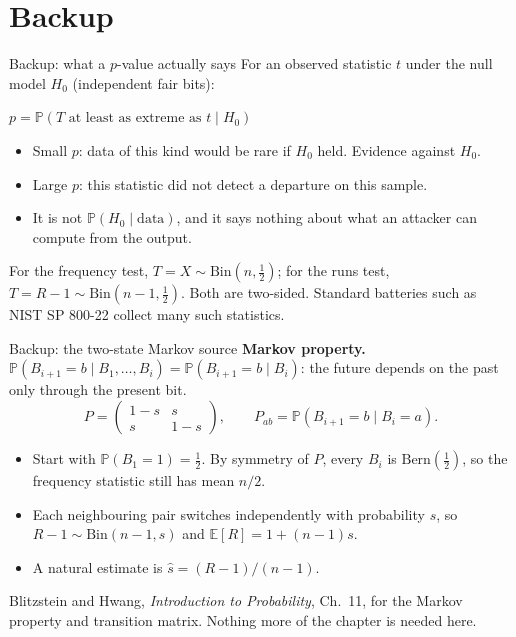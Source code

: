 \documentclass[11pt,aspectratio=169]{beamer}
\newcommand{\Prob}[1]{\mathbb{P}\!\left(#1\right)}
\newcommand{\Ex}[1]{\mathbb{E}\!\left[#1\right]}
\newcommand{\Bern}{\mathrm{Bern}}
\newcommand{\Bin}{\mathrm{Bin}}
\newcommand{\keyeq}[1]{\begin{center}\large\color{deep}$\displaystyle #1$\end{center}}
\begin{document}
\appendix
\section{Backup}

\begin{frame}{Backup: what a $p$-value actually says}
  For an observed statistic $t$ under the null model $H_0$
  (independent fair bits):
  \keyeq{p=\Prob{T\text{ at least as extreme as }t\mid H_0}}
  \begin{itemize}
    \item Small $p$: data of this kind would be rare if $H_0$ held.
          Evidence against $H_0$.
    \item Large $p$: this statistic did not detect a departure on this sample.
    \item It is not $\Prob{H_0\mid\text{data}}$, and it says nothing about
          what an attacker can compute from the output.
  \end{itemize}
  \medskip
  For the frequency test, $T=X\sim\Bin(n,\tfrac12)$; for the runs test,
  $T=R-1\sim\Bin(n-1,\tfrac12)$. Both are two-sided.
  Standard batteries such as NIST SP 800-22 collect many such statistics.
\end{frame}

\begin{frame}{Backup: the two-state Markov source}
  \textbf{Markov property.} $\Prob{B_{i+1}=b\mid B_1,\ldots,B_i}
  =\Prob{B_{i+1}=b\mid B_i}$: the future depends on the past only
  through the present bit.
  \medskip
  \[P=\begin{pmatrix}1-s&s\\ s&1-s\end{pmatrix},
    \qquad P_{ab}=\Prob{B_{i+1}=b\mid B_i=a}.\]
  \begin{itemize}
    \item Start with $\Prob{B_1=1}=\tfrac12$. By symmetry of $P$, every
          $B_i$ is $\Bern(\tfrac12)$, so the frequency statistic still has
          mean $n/2$.
    \item Each neighbouring pair switches independently with probability
          $s$, so $R-1\sim\Bin(n-1,s)$ and $\Ex{R}=1+(n-1)s$.
    \item A natural estimate is $\hat s=(R-1)/(n-1)$.
  \end{itemize}
  \medskip
  \small Blitzstein and Hwang, \emph{Introduction to Probability}, Ch.~11,
  for the Markov property and transition matrix. Nothing more of the chapter
  is needed here.
\end{frame}
\end{document}

